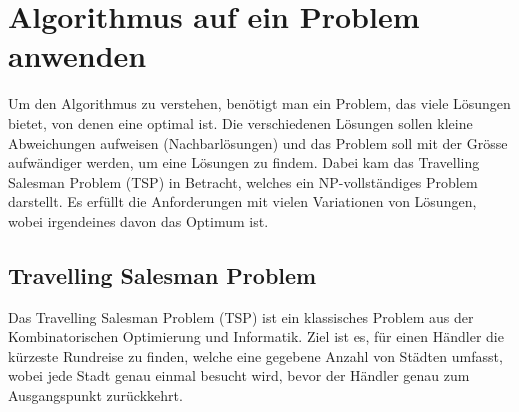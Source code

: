 %
%
%
%
\section{Algorithmus auf ein Problem anwenden}
\label{variationsprinzip_algorithmen:section:find_problem}
Um den Algorithmus zu verstehen, benötigt man ein Problem, das 
viele Lösungen bietet, von denen eine optimal ist. Die verschiedenen 
Lösungen sollen kleine Abweichungen aufweisen (Nachbarlösungen) 
und das Problem soll mit der Grösse aufwändiger werden, um eine 
Lösungen zu findem. Dabei kam das Travelling Salesman Problem (TSP) 
in Betracht, welches ein NP-vollständiges Problem darstellt. Es 
erfüllt die Anforderungen mit vielen Variationen von Lösungen, wobei
irgendeines davon das Optimum ist.

\subsection{Travelling Salesman Problem}
\label{variationsprinzip_algorithmen:section:tsp}
Das Travelling Salesman Problem (TSP) ist ein klassisches Problem 
aus der Kombinatorischen Optimierung und Informatik. Ziel ist es, 
für einen Händler die kürzeste Rundreise zu finden, welche eine 
gegebene Anzahl von Städten umfasst, wobei jede Stadt 
genau einmal besucht wird, bevor der Händler genau zum Ausgangspunkt 
zurückkehrt. 

